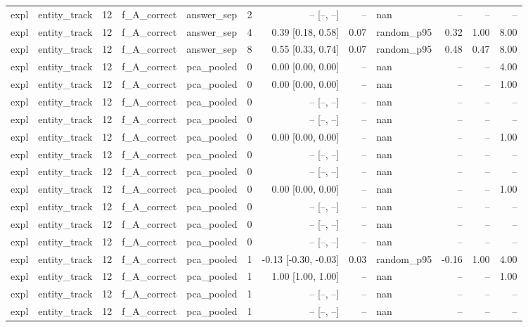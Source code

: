 \begin{tabular}{llrllrrrlrrr}
expl & entity\_track & 12 & f\_A\_correct & answer\_sep & 2 & -- [--, --] & -- & nan & -- & -- & -- \\
expl & entity\_track & 12 & f\_A\_correct & answer\_sep & 4 & 0.39 [0.18, 0.58] & 0.07 & random\_p95 & 0.32 & 1.00 & 8.00 \\
expl & entity\_track & 12 & f\_A\_correct & answer\_sep & 8 & 0.55 [0.33, 0.74] & 0.07 & random\_p95 & 0.48 & 0.47 & 8.00 \\
expl & entity\_track & 12 & f\_A\_correct & pca\_pooled & 0 & 0.00 [0.00, 0.00] & -- & nan & -- & -- & 4.00 \\
expl & entity\_track & 12 & f\_A\_correct & pca\_pooled & 0 & 0.00 [0.00, 0.00] & -- & nan & -- & -- & 1.00 \\
expl & entity\_track & 12 & f\_A\_correct & pca\_pooled & 0 & -- [--, --] & -- & nan & -- & -- & -- \\
expl & entity\_track & 12 & f\_A\_correct & pca\_pooled & 0 & -- [--, --] & -- & nan & -- & -- & -- \\
expl & entity\_track & 12 & f\_A\_correct & pca\_pooled & 0 & 0.00 [0.00, 0.00] & -- & nan & -- & -- & 1.00 \\
expl & entity\_track & 12 & f\_A\_correct & pca\_pooled & 0 & -- [--, --] & -- & nan & -- & -- & -- \\
expl & entity\_track & 12 & f\_A\_correct & pca\_pooled & 0 & -- [--, --] & -- & nan & -- & -- & -- \\
expl & entity\_track & 12 & f\_A\_correct & pca\_pooled & 0 & 0.00 [0.00, 0.00] & -- & nan & -- & -- & 1.00 \\
expl & entity\_track & 12 & f\_A\_correct & pca\_pooled & 0 & -- [--, --] & -- & nan & -- & -- & -- \\
expl & entity\_track & 12 & f\_A\_correct & pca\_pooled & 0 & -- [--, --] & -- & nan & -- & -- & -- \\
expl & entity\_track & 12 & f\_A\_correct & pca\_pooled & 0 & -- [--, --] & -- & nan & -- & -- & -- \\
expl & entity\_track & 12 & f\_A\_correct & pca\_pooled & 1 & -0.13 [-0.30, -0.03] & 0.03 & random\_p95 & -0.16 & 1.00 & 4.00 \\
expl & entity\_track & 12 & f\_A\_correct & pca\_pooled & 1 & 1.00 [1.00, 1.00] & -- & nan & -- & -- & 1.00 \\
expl & entity\_track & 12 & f\_A\_correct & pca\_pooled & 1 & -- [--, --] & -- & nan & -- & -- & -- \\
expl & entity\_track & 12 & f\_A\_correct & pca\_pooled & 1 & -- [--, --] & -- & nan & -- & -- & -- \\

\end{tabular}
